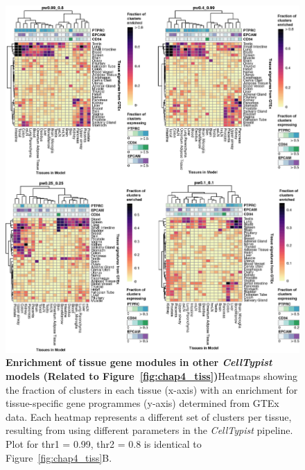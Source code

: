 \begin{figure}[ht!] 
\centering
\includegraphics[width=1.0\textwidth]{Appendix2/Figs/appB_tissueGSEA.png} %
\caption[Enrichment of tissue gene modules in other \textit{CellTypist} models]{\textbf{Enrichment of tissue gene modules in other \textit{CellTypist} models (Related to Figure~\ref{fig:chap4_tiss})}\newline Heatmaps showing the fraction of clusters in each tissue (x-axis) with an enrichment for tissue-specific gene programmes (y-axis) determined from GTEx data. Each heatmap represents a different set of clusters per tissue, resulting from using different parameters in the \textit{CellTypist} pipeline. Plot for thr1 = 0.99, thr2 = 0.8 is identical to Figure~\ref{fig:chap4_tiss}B.}
\label{fig:appB_tissGSEA}
\end{figure}


